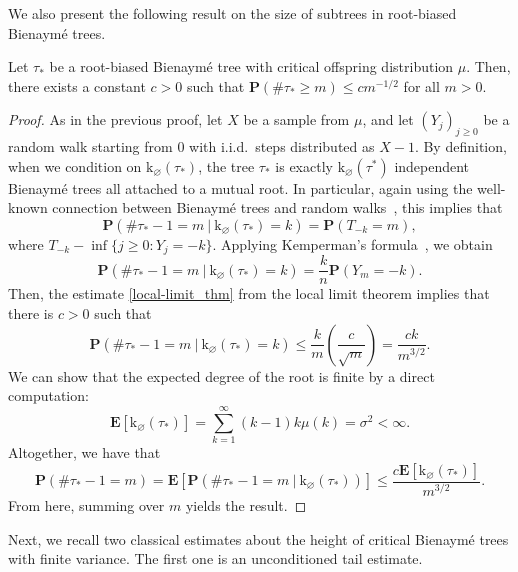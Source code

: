 \documentclass[11pt,reqno]{amsart}
\newcommand{\1}{\mathbf{1}}
\newcommand{\0}{\mathbf{0}}
\newcommand{\prob}{\mathbf{P}}
\newcommand{\ex}{\mathbf{E}}
\newcommand{\rk}{\mathrm{k}}
\renewcommand{\emptyset}{\varnothing}
\begin{document}
We also present the following result on the size of subtrees in root-biased Bienaym\'{e} trees.

\begin{lem}\label{lem:size-biased_tail}
    Let $\tau_*$ be a root-biased Bienaymé tree with critical offspring distribution $\mu$. Then, there exists a constant $c > 0$ such that $\prob(\#\tau_* \geq m) \leq cm^{-1/2}$ for all $m>0$.
\end{lem}

\begin{proof}
    As in the previous proof, let $X$ be a sample from $\mu$, and let $(Y_j)_{j\ge 0}$ be a random walk starting from $0$ with i.i.d.~steps distributed as $X-1$.
    By definition, when we condition on $\rk_\emptyset(\tau_*)$, the tree $\tau_*$ is exactly $\rk_\emptyset(\tau^*)$ independent Bienaym\'{e} trees all attached to a mutual root. In particular, again using the well-known connection between Bienaym\'{e} trees and random walks~\cite[Corollary 1.6]{legall2005random}, this implies that
    $$
    \prob(\# \tau_*-1 = m  \ | \  \rk_\emptyset(\tau_*) = k) = \prob( T_{-k} = m),
    $$
    where $T_{-k} - \inf\{ j \geq 0 : Y_j = -k \}$. Applying Kemperman's formula~\cite{van2008elementary}, we obtain
    \begin{equation}
    \label{kemperman_formula}
    \prob(\# \tau_*-1 = m  \ | \  \rk_\emptyset(\tau_*) = k) = \frac{k}{n}\prob(Y_m = -k).
    \end{equation}
    Then, the estimate \eqref{local-limit_thm} from the local limit theorem implies that there is $c > 0$ such that
    $$
    \prob(\# \tau_*-1 = m  \ | \  \rk_\emptyset(\tau_*) = k) \leq \frac{k}{m}\left(\frac{c}{\sqrt{m}}\right) = \frac{ck}{m^{3/2}}.
    $$
    We can show that the expected degree of the root is finite by a direct computation:
    \begin{equation}
    \label{first-moment_root-biased}
    \ex[\rk_\emptyset(\tau_*)] = \sum_{k = 1}^\infty (k-1)k\mu(k) = \sigma^2 < \infty.
    \end{equation}
    Altogether, we have that
    $$
    \prob(\# \tau_* - 1 = m) = \ex\left[ \prob(\# \tau_*-1 = m  \ | \  \rk_\emptyset(\tau_*)) \right] \leq \frac{c\ex[\rk_\emptyset(\tau_*)]}{m^{3/2}}.
    $$
    From here, summing over $m$ yields the result.
\end{proof}

Next, we recall two classical estimates about the height of critical Bienaymé trees with finite variance. The first one is an unconditioned tail estimate.
\end{document}
